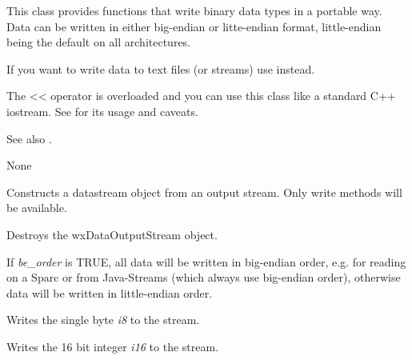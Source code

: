 This class provides functions that write binary data types in a
portable way. Data can be written in either big-endian or litte-endian
format, little-endian being the default on all architectures.

If you want to write data to text files (or streams) use 
 instead.

The << operator is overloaded and you can use this class like a standard 
C++ iostream. See  for its 
usage and caveats.

See also . 


None


\label{wxdataoutputstreamconstr}


Constructs a datastream object from an output stream. Only write methods will
be available.





Destroys the wxDataOutputStream object.



If {\it be\_order} is TRUE, all data will be written in big-endian
order, e.g. for reading on a Sparc or from Java-Streams (which
always use big-endian order), otherwise data will be written in
little-endian order.
 


Writes the single byte {\it i8} to the stream.



Writes the 16 bit integer {\it i16} to the stream.

